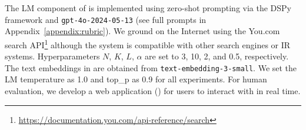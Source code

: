 \documentclass[11pt]{article}
\begin{document}










The LM component of \system is implemented using zero-shot prompting via the DSPy framework \citep{khattab2023dspy} and \texttt{gpt-4o-2024-05-13} (see full prompts in Appendix~\ref{appendix:rubric}). We ground \system on the Internet using the You.com search API\footnote{\url{https://documentation.you.com/api-reference/search}} although the system is compatible with other search engines or IR systems. Hyperparameters $N$, $K$, $L$, $\alpha$ are set to 3, 10, 2, and 0.5, respectively. The text embeddings in  are obtained from \texttt{text-embedding-3-small}. We set the LM temperature as 1.0 and top\_p as 0.9 for all experiments. For human evaluation, we develop a web application () for users to interact with \system in real time.
\end{document}
